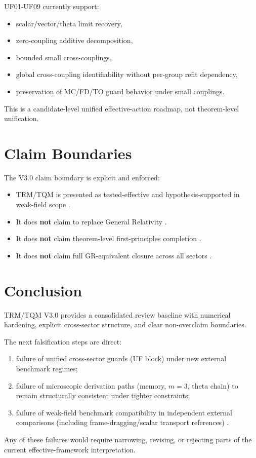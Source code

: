 \documentclass[11pt,a4paper]{article}
\begin{document}
UF01-UF09 currently support:

\begin{itemize}
  \item scalar/vector/theta limit recovery,
  \item zero-coupling additive decomposition,
  \item bounded small cross-couplings,
  \item global cross-coupling identifiability without per-group refit dependency,
  \item preservation of MC/FD/TO guard behavior under small couplings.
\end{itemize}

This is a candidate-level unified effective-action roadmap, not theorem-level unification.

\section{Claim Boundaries}

The V3.0 claim boundary is explicit and enforced:

\begin{itemize}
  \item TRM/TQM is presented as tested-effective and hypothesis-supported in weak-field scope \cite{trm_status_v3}.
  \item It does \textbf{not} claim to replace General Relativity \cite{gr_tests}.
  \item It does \textbf{not} claim theorem-level first-principles completion \cite{gap_list}.
  \item It does \textbf{not} claim full GR-equivalent closure across all sectors \cite{lense_thirring}.
\end{itemize}

\section{Conclusion}

TRM/TQM V3.0 provides a consolidated review baseline with numerical hardening, explicit cross-sector structure, and clear non-overclaim boundaries.

The next falsification steps are direct:

\begin{enumerate}
  \item failure of unified cross-sector guards (UF block) under new external benchmark regimes;
  \item failure of microscopic derivation paths (memory, \(m=3\), theta chain) to remain structurally consistent under tighter constraints;
  \item failure of weak-field benchmark compatibility in independent external comparisons (including frame-dragging/scalar transport references) \cite{lense_thirring,sparc}.
\end{enumerate}

Any of these failures would require narrowing, revising, or rejecting parts of the current effective-framework interpretation.



\end{document}
